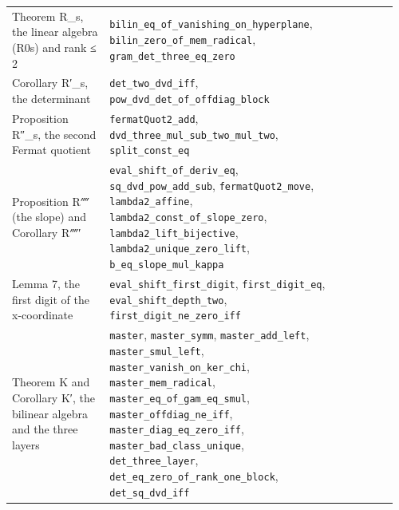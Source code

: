 \documentclass[11pt,a4paper]{article}
\theoremstyle{named}
\begin{document}
\begin{small}
\begin{longtable}{>{\raggedright\arraybackslash}p{0.242\linewidth}>{\raggedright\arraybackslash}p{0.574\linewidth}>{\raggedright\arraybackslash}p{0.143\linewidth}}
Theorem R\_s, the linear algebra (R0s) and rank ≤ 2 & \texttt{bilin\_\allowbreak{}eq\_\allowbreak{}of\_\allowbreak{}vanishing\_\allowbreak{}on\_\allowbreak{}hyperplane}, \texttt{bilin\_\allowbreak{}zero\_\allowbreak{}of\_\allowbreak{}mem\_\allowbreak{}radical}, \texttt{gram\_\allowbreak{}det\_\allowbreak{}three\_\allowbreak{}eq\_\allowbreak{}zero} & 10 \\
Corollary R′\_s, the determinant & \texttt{det\_\allowbreak{}two\_\allowbreak{}dvd\_\allowbreak{}iff}, \texttt{pow\_\allowbreak{}dvd\_\allowbreak{}det\_\allowbreak{}of\_\allowbreak{}offdiag\_\allowbreak{}block} & 10 \\
Proposition R″\_s, the second Fermat quotient & \texttt{fermatQuot2\_\allowbreak{}add}, \texttt{dvd\_\allowbreak{}three\_\allowbreak{}mul\_\allowbreak{}sub\_\allowbreak{}two\_\allowbreak{}mul\_\allowbreak{}two}, \texttt{split\_\allowbreak{}const\_\allowbreak{}eq} & 10 \\
Proposition R⁗ (the slope) and Corollary R⁗′ & \texttt{eval\_\allowbreak{}shift\_\allowbreak{}of\_\allowbreak{}deriv\_\allowbreak{}eq}, \texttt{sq\_\allowbreak{}dvd\_\allowbreak{}pow\_\allowbreak{}add\_\allowbreak{}sub}, \texttt{fermatQuot2\_\allowbreak{}move}, \texttt{lambda2\_\allowbreak{}affine}, \texttt{lambda2\_\allowbreak{}const\_\allowbreak{}of\_\allowbreak{}slope\_\allowbreak{}zero}, \texttt{lambda2\_\allowbreak{}lift\_\allowbreak{}bijective}, \texttt{lambda2\_\allowbreak{}unique\_\allowbreak{}zero\_\allowbreak{}lift}, \texttt{b\_\allowbreak{}eq\_\allowbreak{}slope\_\allowbreak{}mul\_\allowbreak{}kappa} & 11 \\
Lemma 7, the first digit of the x-coordinate & \texttt{eval\_\allowbreak{}shift\_\allowbreak{}first\_\allowbreak{}digit}, \texttt{first\_\allowbreak{}digit\_\allowbreak{}eq}, \texttt{eval\_\allowbreak{}shift\_\allowbreak{}depth\_\allowbreak{}two}, \texttt{first\_\allowbreak{}digit\_\allowbreak{}ne\_\allowbreak{}zero\_\allowbreak{}iff} & 12 \\
Theorem K and Corollary K′, the bilinear algebra and the three layers & \texttt{master}, \texttt{master\_\allowbreak{}symm}, \texttt{master\_\allowbreak{}add\_\allowbreak{}left}, \texttt{master\_\allowbreak{}smul\_\allowbreak{}left}, \texttt{master\_\allowbreak{}vanish\_\allowbreak{}on\_\allowbreak{}ker\_\allowbreak{}chi}, \texttt{master\_\allowbreak{}mem\_\allowbreak{}radical}, \texttt{master\_\allowbreak{}eq\_\allowbreak{}of\_\allowbreak{}gam\_\allowbreak{}eq\_\allowbreak{}smul}, \texttt{master\_\allowbreak{}offdiag\_\allowbreak{}ne\_\allowbreak{}iff}, \texttt{master\_\allowbreak{}diag\_\allowbreak{}eq\_\allowbreak{}zero\_\allowbreak{}iff}, \texttt{master\_\allowbreak{}bad\_\allowbreak{}class\_\allowbreak{}unique}, \texttt{det\_\allowbreak{}three\_\allowbreak{}layer}, \texttt{det\_\allowbreak{}eq\_\allowbreak{}zero\_\allowbreak{}of\_\allowbreak{}rank\_\allowbreak{}one\_\allowbreak{}block}, \texttt{det\_\allowbreak{}sq\_\allowbreak{}dvd\_\allowbreak{}iff} & 12 \\

\end{longtable}
\end{small}
\end{document}
